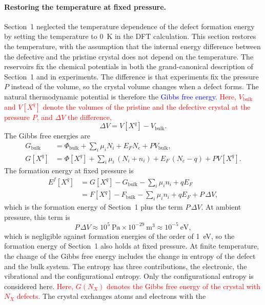\paragraph{Restoring the temperature at fixed pressure.}
Section~1 neglected the temperature dependence of the defect formation energy
by setting the temperature to 0~K in the DFT calculation. This section
restores the temperature, with the assumption that the internal energy
difference between the defective and the pristine crystal does not depend on
the temperature. The reservoirs fix the chemical potentials in both the
grand-canonical description of Section~1 and in experiments. The difference
is that experiments fix the pressure $P$ instead of the volume, so the
crystal volume changes when a defect forms. The natural thermodynamic
potential is therefore the \textcolor{blue}{Gibbs free energy}.
\textcolor{red}{Here, $V_{\text{bulk}}$ and $V[X^q]$ denote the volumes of
the pristine and the defective crystal at the pressure $P$, and $\Delta V$
the difference,}
\begin{equation*}
    \Delta V=V[X^q]-V_{\text{bulk}}.
\end{equation*}
The Gibbs free energies are
\begin{align*}
    G_{\text{bulk}}&=\Phi_{\text{bulk}}+\sum_i\mu_iN_i+E_FN_e+PV_{\text{bulk}},\\
    G[X^q]&=\Phi[X^q]+\sum_i\mu_i\,(N_i+n_i)+E_F\,(N_e-q)+PV[X^q].
\end{align*}
The formation energy at fixed pressure is
\begin{align*}
    E^f[X^q]&=G[X^q]-G_{\text{bulk}}-\sum_i\mu_in_i+qE_F\\
    &=F[X^q]-F_{\text{bulk}}-\sum_i\mu_in_i+qE_F+P\,\Delta V,
\end{align*}
which is the formation energy of Section~1 plus the term $P\,\Delta V$. At
ambient pressure, this term is
\begin{equation*}
    P\,\Delta V\approx10^{5}~\text{Pa}\times10^{-29}~\text{m}^3
    \approx10^{-5}~\text{eV},
\end{equation*}
which is negligible against formation energies of the order of 1~eV, so the
formation energy of Section~1 also holds at fixed pressure. At finite
temperature, the change of the Gibbs free energy includes the change in
entropy of the defect and the bulk system. The entropy has three
contributions, the electronic, the vibrational and the configurational
entropy. Only the configurational entropy is considered here.
\textcolor{red}{Here, $G(N_X)$ denotes the Gibbs free energy of the crystal
with $N_X$ defects.} The crystal exchanges atoms and electrons with the

